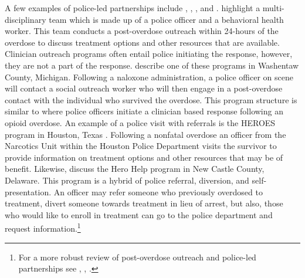 A few examples of police-led partnerships include \textcite{botieri_guide_2016}, \textcite{dahlem_beyond_2017}, \textcite{donnelly_law_2022}, and \textcite{yatsco_alternatives_2020}. \textcite{botieri_guide_2016} highlight a multi-disciplinary team which is made up of a police officer and a behavioral health worker. This team conducts a post-overdose outreach within 24-hours of the overdose to discuss treatment options and other resources that are available. Clinician outreach programs often entail police initiating the response, however, they are not a part of the response. \textcite{dahlem_beyond_2017} describe one of these programs in Washentaw County, Michigan. Following a naloxone administration, a police officer on scene will contact a social outreach worker who will then engage in a post-overdose contact with the individual who survived the overdose. This program structure is similar to \textcite{wagner_training_2016} where police officers initiate a clinician based response following an opioid overdose. An example of a police visit with referrals is the HEROES program in Houston, Texas \parencite{yatsco_alternatives_2020}. Following a nonfatal overdose an officer from the Narcotics Unit within the Houston Police Department visits the survivor to provide information on treatment options and other resources that may be of benefit. Likewise, \textcite{donnelly_law_2022} discuss the Hero Help program in New Castle County, Delaware. This program is a hybrid of police referral, diversion, and self-presentation. An officer may refer someone who previously overdosed to treatment, divert someone towards treatment in lieu of arrest, but also, those who would like to enroll in treatment can go to the police department and request information.\footnote{For a more robust review of post-overdose outreach and police-led partnerships see \textcite{bagley_scoping_2019}, \textcite{bailey_scoping_2023}, \textcite{yatsco_developing_2020}.}

